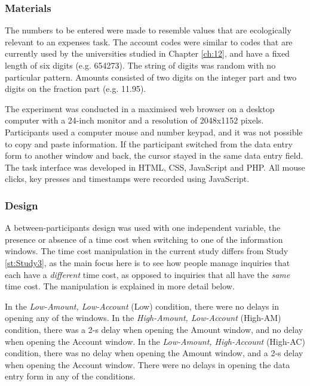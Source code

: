 \subsubsection{Materials}
The numbers to be entered were made to resemble values that are ecologically relevant to an expenses task. The account codes were similar to codes that are currently used by the universities studied in Chapter \ref{ch:12}, and have a fixed length of six digits (e.g. 654273). The string of digits was random with no particular pattern. Amounts consisted of two digits on the integer part and two digits on the fraction part (e.g. 11.95). 

The experiment was conducted in a maximised web browser on a desktop computer with a 24-inch monitor and a resolution of 2048x1152 pixels. Participants used a computer mouse and number keypad, and it was not possible to copy and paste information. If the participant switched from the data entry form to another window and back, the cursor stayed in the same data entry field. The task interface was developed in HTML, CSS, JavaScript and PHP. All mouse clicks, key presses and timestamps were recorded using JavaScript.

\subsubsection{Design}
A between-participants design was used with one independent variable, the presence or absence of a time cost when switching to one of the information windows. The time cost manipulation in the current study differs from Study \ref{st:Study3}, as the main focus here is to see how people manage inquiries that each have a \textit{different} time cost, as opposed to inquiries that all have the \textit{same} time cost. The manipulation is explained in more detail below. 

In the \textit{Low-Amount, Low-Account} (Low) condition, there were no delays in opening any of the windows. In the \textit{High-Amount, Low-Account} (High-AM) condition, there was a 2-s delay when opening the Amount window, and no delay when opening the Account window. In the \textit{Low-Amount, High-Account} (High-AC) condition, there was no delay when opening the Amount window, and a 2-s delay when opening the Account window. There were no delays in opening the data entry form in any of the conditions.

